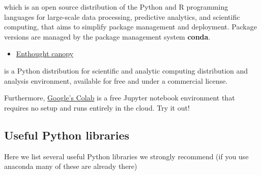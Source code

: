 \documentclass[%
oneside,                 %
final,                   %
10pt]{article}
\begin{document}
\noindent
which is an open source
distribution of the Python and R programming languages for large-scale
data processing, predictive analytics, and scientific computing, that
aims to simplify package management and deployment. Package versions
are managed by the package management system \textbf{conda}. 

\begin{itemize}
\item \href{{https://www.enthought.com/product/canopy/}}{Enthought canopy} 
\end{itemize}

\noindent
is a Python
distribution for scientific and analytic computing distribution and
analysis environment, available for free and under a commercial
license.

Furthermore, \href{{https://colab.research.google.com/notebooks/welcome.ipynb}}{Google's Colab} is a free Jupyter notebook environment that requires 
no setup and runs entirely in the cloud. Try it out!

\subsection{Useful Python libraries}
Here we list several useful Python libraries we strongly recommend (if you use anaconda many of these are already there)
\end{document}
